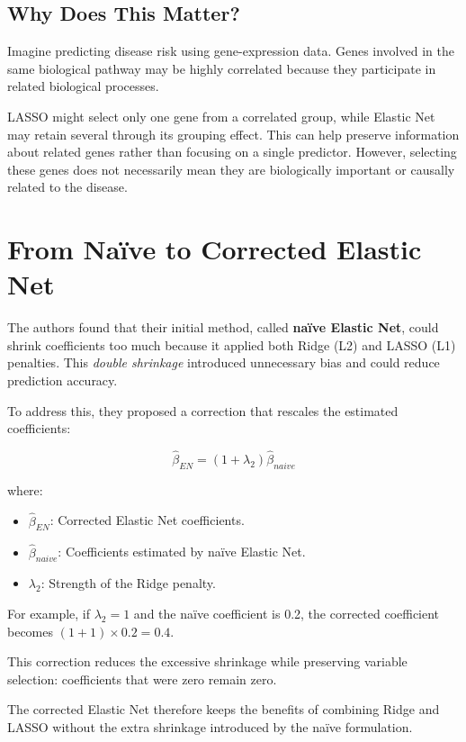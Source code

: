 \documentclass[
  letterpaper,
  DIV=11,
  numbers=noendperiod]{scrreprt}
\providecommand{\tightlist}{%
  \setlength{\itemsep}{0pt}\setlength{\parskip}{0pt}}
\begin{document}
\subsection{Why Does This Matter?}\label{why-does-this-matter}

Imagine predicting disease risk using gene-expression data. Genes
involved in the same biological pathway may be highly correlated because
they participate in related biological processes.

LASSO might select only one gene from a correlated group, while Elastic
Net may retain several through its grouping effect. This can help
preserve information about related genes rather than focusing on a
single predictor. However, selecting these genes does not necessarily
mean they are biologically important or causally related to the disease.

\section{From Naïve to Corrected Elastic
Net}\label{from-nauxefve-to-corrected-elastic-net}

The authors found that their initial method, called \textbf{naïve
Elastic Net}, could shrink coefficients too much because it applied both
Ridge (L2) and LASSO (L1) penalties. This \emph{double shrinkage}
introduced unnecessary bias and could reduce prediction accuracy.

To address this, they proposed a correction that rescales the estimated
coefficients:

\[
\hat{\beta}_{EN}=(1+\lambda_2)\hat{\beta}_{naive}
\]

where:

\begin{itemize}
\tightlist
\item
  \(\hat{\beta}_{EN}\): Corrected Elastic Net coefficients.
\item
  \(\hat{\beta}_{naive}\): Coefficients estimated by naïve Elastic Net.
\item
  \(\lambda_2\): Strength of the Ridge penalty.
\end{itemize}

For example, if \(\lambda_2=1\) and the naïve coefficient is 0.2, the
corrected coefficient becomes \((1+1)\times0.2=0.4\).

This correction reduces the excessive shrinkage while preserving
variable selection: coefficients that were zero remain zero.

The corrected Elastic Net therefore keeps the benefits of combining
Ridge and LASSO without the extra shrinkage introduced by the naïve
formulation.
\end{document}
